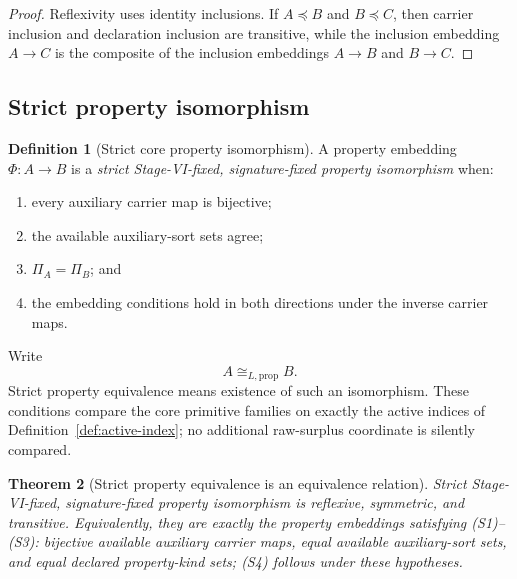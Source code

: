 \documentclass[11pt]{article}
\newtheorem{theorem}{Theorem}[section]
\theoremstyle{definition}
\newtheorem{definition}[theorem]{Definition}
\theoremstyle{remark}
\begin{document}
\begin{proof}
Reflexivity uses identity inclusions.
If \(A\preccurlyeq B\) and \(B\preccurlyeq C\), then carrier inclusion and declaration inclusion are transitive, while the inclusion embedding \(A\to C\) is the composite of the inclusion embeddings \(A\to B\) and \(B\to C\).
\end{proof}

\subsection{Strict property isomorphism}

\begin{definition}[Strict core property isomorphism]
\label{def:strict-iso}
A property embedding \(\Phi:A\to B\) is a \emph{strict Stage-VI-fixed, signature-fixed property isomorphism} when:
\begin{enumerate}[label=(S\arabic*)]
\item every auxiliary carrier map is bijective;
\item the available auxiliary-sort sets agree;
\item \(\Pi_A=\Pi_B\); and
\item the embedding conditions hold in both directions under the inverse carrier maps.
\end{enumerate}
Write
\[
A\cong_{L,\mathrm{prop}} B.
\]
Strict property equivalence means existence of such an isomorphism.
These conditions compare the core primitive families on exactly the
active indices of Definition~\ref{def:active-index}; no additional
raw-surplus coordinate is silently compared.
\end{definition}

\begin{theorem}[Strict property equivalence is an equivalence relation]
\label{thm:strict-equivalence}
Strict Stage-VI-fixed, signature-fixed property isomorphism is reflexive, symmetric, and transitive.
Equivalently, they are exactly the property embeddings satisfying (S1)--(S3): bijective available auxiliary carrier maps, equal available auxiliary-sort sets, and equal declared property-kind sets; (S4) follows under these hypotheses.
\end{theorem}
\end{document}
